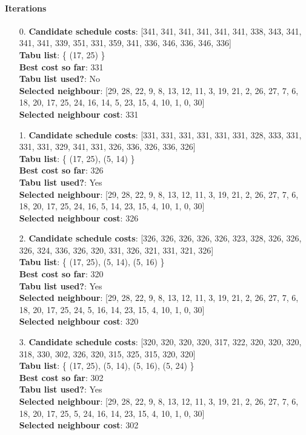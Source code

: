 \documentclass[fleqn]{article}
\begin{document}
  \paragraph{Iterations}
  \begin{itemize}

    \item[0.] \textbf{Candidate schedule costs}: [341, 341, 341, 341, 341, 341, 338, 343, 341, 341, 341, 339, 351, 331, 359, 341, 336, 346, 336, 346, 336] \\
    \textbf{Tabu list}: \{ (17, 25) \} \\
    \textbf{Best cost so far}: 331 \\
    \textbf{Tabu list used?}: No \\
    \textbf{Selected neighbour}: [29, 28, 22, 9, 8, 13, 12, 11, 3, 19, 21, 2, 26, 27, 7, 6, 18, 20, 17, 25, 24, 16, 14, 5, 23, 15, 4, 10, 1, 0, 30] \\
    \textbf{Selected neighbour cost}: 331
      

    \item[1.] \textbf{Candidate schedule costs}: [331, 331, 331, 331, 331, 331, 328, 333, 331, 331, 331, 329, 341, 331, 326, 336, 326, 336, 326] \\
    \textbf{Tabu list}: \{ (17, 25), (5, 14) \} \\
    \textbf{Best cost so far}: 326 \\
    \textbf{Tabu list used?}: Yes \\
    \textbf{Selected neighbour}: [29, 28, 22, 9, 8, 13, 12, 11, 3, 19, 21, 2, 26, 27, 7, 6, 18, 20, 17, 25, 24, 16, 5, 14, 23, 15, 4, 10, 1, 0, 30] \\
    \textbf{Selected neighbour cost}: 326
      

    \item[2.] \textbf{Candidate schedule costs}: [326, 326, 326, 326, 326, 323, 328, 326, 326, 326, 324, 336, 326, 320, 331, 326, 321, 331, 321, 326] \\
    \textbf{Tabu list}: \{ (17, 25), (5, 14), (5, 16) \} \\
    \textbf{Best cost so far}: 320 \\
    \textbf{Tabu list used?}: Yes \\
    \textbf{Selected neighbour}: [29, 28, 22, 9, 8, 13, 12, 11, 3, 19, 21, 2, 26, 27, 7, 6, 18, 20, 17, 25, 24, 5, 16, 14, 23, 15, 4, 10, 1, 0, 30] \\
    \textbf{Selected neighbour cost}: 320
      

    \item[3.] \textbf{Candidate schedule costs}: [320, 320, 320, 320, 317, 322, 320, 320, 320, 318, 330, 302, 326, 320, 315, 325, 315, 320, 320] \\
    \textbf{Tabu list}: \{ (17, 25), (5, 14), (5, 16), (5, 24) \} \\
    \textbf{Best cost so far}: 302 \\
    \textbf{Tabu list used?}: Yes \\
    \textbf{Selected neighbour}: [29, 28, 22, 9, 8, 13, 12, 11, 3, 19, 21, 2, 26, 27, 7, 6, 18, 20, 17, 25, 5, 24, 16, 14, 23, 15, 4, 10, 1, 0, 30] \\
    \textbf{Selected neighbour cost}: 302
      


\end{itemize}
\end{document}
